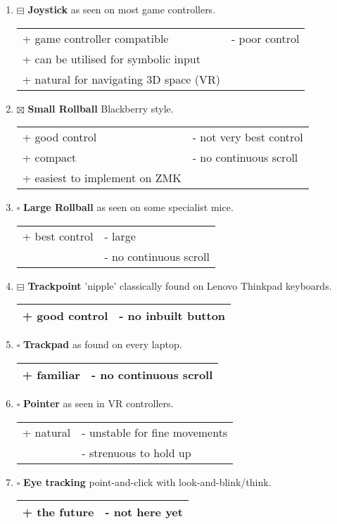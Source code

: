 \documentclass[logo,bsc,singlespacing,parskip]{infthesis}
\begin{document}
\begin{enumerate}
\item{$\boxminus$} \textbf{Joystick} as seen on most game controllers.
\begin{longtable}{|p{6.25cm}|p{6.25cm}|}
\hline
+ game controller compatible & - poor control\\
+ can be utilised for symbolic input & \\
+ natural for navigating 3D space (VR) & \\
\hline
\end{longtable}

\item{$\boxtimes$} \textbf{Small Rollball} Blackberry style.
\begin{longtable}{|p{6.25cm}|p{6.25cm}|}
\hline
+ good control & - not very best control\\
+ compact & - no continuous scroll\\
+ easiest to implement on ZMK & \\
\hline
\end{longtable}

\item{$\square$} \textbf{Large Rollball} as seen on some specialist mice.
\begin{longtable}{|p{6.25cm}|p{6.25cm}|}
\hline
+ best control & - large\\
 & - no continuous scroll\\
\hline
\end{longtable}

\item{$\boxminus$} \textbf{Trackpoint} 'nipple' classically found on Lenovo Thinkpad keyboards.
\begin{longtable}{|p{6.25cm}|p{6.25cm}|}
\hline
+ good control & - no inbuilt button\\
\hline
\end{longtable}

\item{$\square$} \textbf{Trackpad} as found on every laptop.
\begin{longtable}{|p{6.25cm}|p{6.25cm}|}
\hline
+ familiar & - no continuous scroll\\
\hline
\end{longtable}

\item{$\square$} \textbf{Pointer} as seen in VR controllers.
\begin{longtable}{|p{6.25cm}|p{6.25cm}|}
\hline
+ natural & - unstable for fine movements\\
 & - strenuous to hold up\\
\hline
\end{longtable}

\item{$\square$} \textbf{Eye tracking} point-and-click with look-and-blink/think.
\begin{longtable}{|p{6.25cm}|p{6.25cm}|}
\hline
+ the future & - not here yet\\
\hline
\end{longtable}
\end{enumerate}
\end{document}
